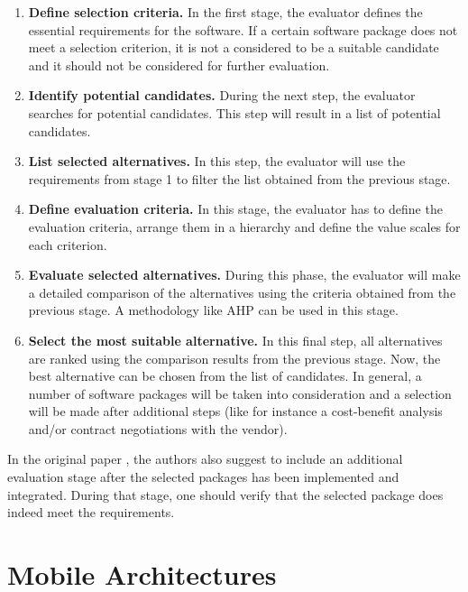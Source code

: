 \begin{enumerate}
    \item \textbf{Define selection criteria.} In the first stage, the evaluator defines the essential requirements for the software. If a certain software package does not meet a selection criterion, it is not a considered to be a suitable candidate and it should not be considered for further evaluation. 
    \item \textbf{Identify potential candidates.} During the next step, the evaluator searches for potential candidates. This step will result in a list of potential candidates.
    \item \textbf{List selected alternatives.} In this step, the evaluator will use the requirements from stage 1 to filter the list obtained from the previous stage. 
    \item \textbf{Define evaluation criteria.} In this stage, the evaluator has to define the evaluation criteria, arrange them in a hierarchy and define the value scales for each criterion. 
    \item \textbf{Evaluate selected alternatives.} During this phase, the evaluator will make a detailed comparison of the alternatives using the criteria obtained from the previous stage. A methodology like AHP can be used in this stage.
    \item \textbf{Select the most suitable alternative.} In this final step, all alternatives are ranked using the comparison results from the previous stage. Now, the best alternative can be chosen from the list of candidates. In general, a number of software packages will be taken into consideration and a selection will be made after additional steps (like for instance a cost-benefit analysis and/or contract negotiations with the vendor). 
\end{enumerate}

In the original paper \cite{Jadhav:2009}, the authors also suggest to include an additional evaluation stage after the selected packages has been implemented and integrated. During that stage, one should verify that the selected package does indeed meet the requirements.

\section{Mobile Architectures}



